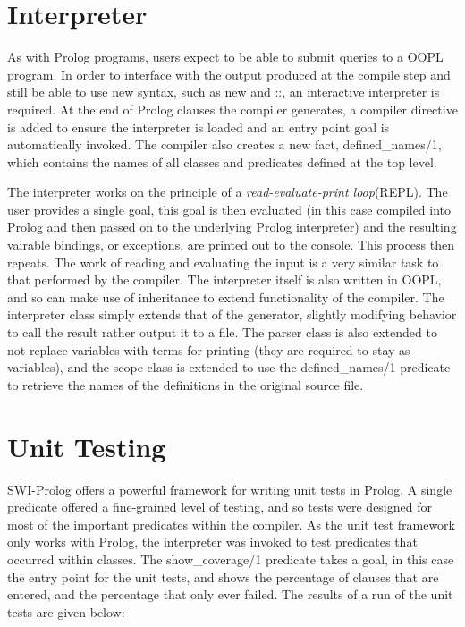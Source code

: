 \documentclass[12pt,a4paper,twoside,openright]{report}
\begin{document}
\section{Interpreter}

As with Prolog programs, users expect to be able to submit queries to a OOPL program. In order to interface with the output produced at the compile step and still be able to use new syntax, such as new and ::, an interactive interpreter is required. At the end of Prolog clauses the compiler generates, a compiler directive is added to ensure the interpreter is loaded and an entry point goal is automatically invoked. The compiler also creates a new fact, defined_names/1, which contains the names of all classes and predicates defined at the top level.

\bigskip

The interpreter works on the principle of a \emph{read-evaluate-print loop}(REPL). The user provides a single goal, this goal is then evaluated (in this case compiled into Prolog and then passed on to the underlying Prolog interpreter) and the resulting vairable bindings, or exceptions, are printed out to the console. This process then repeats. The work of reading and evaluating the input is a very similar task to that performed by the compiler. The interpreter itself is also written in OOPL, and so can make use of inheritance to extend functionality of the compiler. The interpreter class simply extends that of the generator, slightly modifying behavior to call the result rather output it to a file. The parser class is also extended to not replace variables with terms for printing (they are required to stay as variables), and the scope class is extended to use the defined_names/1 predicate to retrieve the names of the definitions in the original source file.

\section{Unit Testing}

 SWI-Prolog offers a powerful framework for writing unit tests in Prolog. A single predicate offered a fine-grained level of testing, and so tests were designed for most of the important predicates within the compiler. As the unit test framework only works with Prolog, the interpreter was invoked to test predicates that occurred within classes. The show_coverage/1 predicate takes a goal, in this case the entry point for the unit tests, and shows the percentage of clauses that are entered, and the percentage that only ever failed. The results of a run of the unit tests are given below:
 
\end{document}
